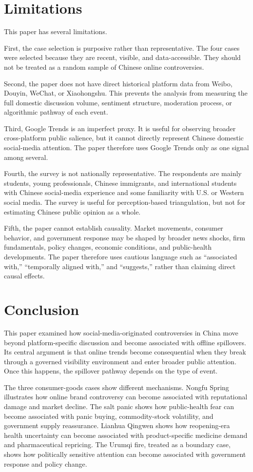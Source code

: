 \documentclass[conference]{IEEEtran}
\begin{document}
\section{Limitations}
This paper has several limitations.

First, the case selection is purposive rather than representative. The four cases were selected because they are recent, visible, and data-accessible. They should not be treated as a random sample of Chinese online controversies.

Second, the paper does not have direct historical platform data from Weibo, Douyin, WeChat, or Xiaohongshu. This prevents the analysis from measuring the full domestic discussion volume, sentiment structure, moderation process, or algorithmic pathway of each event.

Third, Google Trends is an imperfect proxy. It is useful for observing broader cross-platform public salience, but it cannot directly represent Chinese domestic social-media attention. The paper therefore uses Google Trends only as one signal among several.

Fourth, the survey is not nationally representative. The respondents are mainly students, young professionals, Chinese immigrants, and international students with Chinese social-media experience and some familiarity with U.S. or Western social media. The survey is useful for perception-based triangulation, but not for estimating Chinese public opinion as a whole.

Fifth, the paper cannot establish causality. Market movements, consumer behavior, and government response may be shaped by broader news shocks, firm fundamentals, policy changes, economic conditions, and public-health developments. The paper therefore uses cautious language such as ``associated with,'' ``temporally aligned with,'' and ``suggests,'' rather than claiming direct causal effects.

\section{Conclusion}
This paper examined how social-media-originated controversies in China move beyond platform-specific discussion and become associated with offline spillovers. Its central argument is that online trends become consequential when they break through a governed visibility environment and enter broader public attention. Once this happens, the spillover pathway depends on the type of event.

The three consumer-goods cases show different mechanisms. Nongfu Spring illustrates how online brand controversy can become associated with reputational damage and market decline. The salt panic shows how public-health fear can become associated with panic buying, commodity-stock volatility, and government supply reassurance. Lianhua Qingwen shows how reopening-era health uncertainty can become associated with product-specific medicine demand and pharmaceutical repricing. The Urumqi fire, treated as a boundary case, shows how politically sensitive attention can become associated with government response and policy change.
\end{document}
